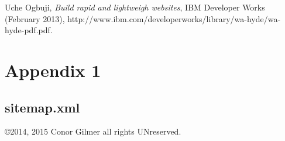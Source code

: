 \documentclass[12pt]{article}			%
\begin{document}
\newpage
\begin{thebibliography}{9}

 Uche Ogbuji, \emph{Build rapid and lightweigh websites}, IBM Developer Works (February 2013), http://www.ibm.com/developerworks/library/wa-hyde/wa-hyde-pdf.pdf.  
\end{thebibliography}



\newpage
\appendix
\section{Appendix 1}
\subsection{sitemap.xml}

\copyright 2014, 2015 Conor Gilmer  all rights UNreserved.
\end{document}
